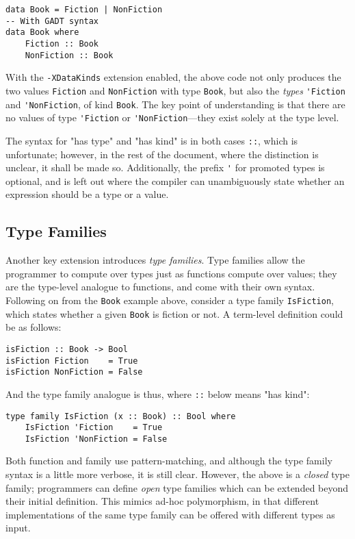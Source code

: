 \documentclass[12pt, a4paper, bibliography=totocnumbered]{scrreprt}
\newcommand{\inline}[1]{\lstinline[basicstyle=\ttfamily\footnotesize]{#1}}
\begin{document}
\begin{lstlisting}
data Book = Fiction | NonFiction
-- With GADT syntax
data Book where
    Fiction :: Book
    NonFiction :: Book
\end{lstlisting}

With the \inline{-XDataKinds} extension enabled, the above code not only produces the two values \inline{Fiction} and \inline{NonFiction} with type \inline{Book}, but also the \emph{types} \inline{'Fiction} and \inline{'NonFiction}, of kind \inline{Book}. The key point of understanding is that there are no values of type \inline{'Fiction} or \inline{'NonFiction}---they exist solely at the type level.

The syntax for "has type" and "has kind" is in both cases \inline{::}, which is unfortunate; however, in the rest of the document, where the distinction is unclear, it shall be made so. Additionally, the prefix \inline{'} for promoted types is optional, and is left out where the compiler can unambiguously state whether an expression should be a type or a value.

\subsection{Type Families}

Another key extension introduces \emph{type families}. Type families allow the programmer to compute over types just as functions compute over values; they are the type-level analogue to functions, and come with their own syntax. Following on from the \inline{Book} example above, consider a type family \inline{IsFiction}, which states whether a given \inline{Book} is fiction or not. A term-level definition could be as follows:

\begin{lstlisting}
isFiction :: Book -> Bool
isFiction Fiction    = True
isFiction NonFiction = False
\end{lstlisting}

And the type family analogue is thus, where \inline{::} below means "has kind":

\begin{lstlisting}
type family IsFiction (x :: Book) :: Bool where
    IsFiction 'Fiction    = True
    IsFiction 'NonFiction = False
\end{lstlisting}

Both function and family use pattern-matching, and although the type family syntax is a little more verbose, it is still clear. However, the above is a \emph{closed} type family; programmers can define \emph{open} type families which can be extended beyond their initial definition. This mimics ad-hoc polymorphism, in that different implementations of the same type family can be offered with different types as input.
\end{document}

